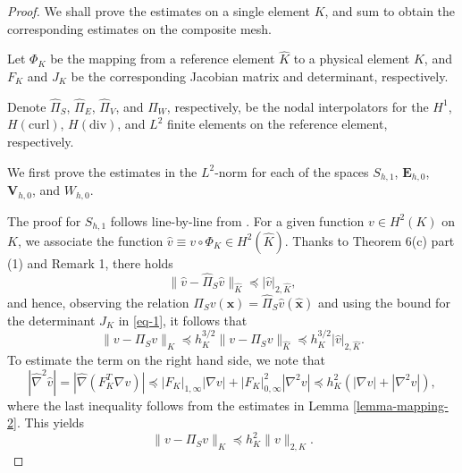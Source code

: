 \documentclass[twoside,reqno,final]{amsart}
\renewcommand{\b}[1]{{\boldsymbol{#1}}}
\newcommand{\pol}{\mathbb{P}}
\begin{document}
\begin{proof}
We shall prove the estimates on a single element $K$, and sum to obtain 
the corresponding estimates on the composite mesh.

Let $\Phi_K$ be the mapping from a reference element $\widehat K$ to a physical element $K$, and 
$F_K$ and $J_K$ be the corresponding Jacobian matrix and determinant, respectively.

 Denote $\widehat {\varPi}_S$,
  $\widehat {\b \varPi}_E$,  $\widehat {\b \varPi}_V$,  and 
  $\widehat {\varPi}_W$, respectively,  be the nodal interpolators for the 
  $H^1$, $H(\mathrm{curl})$, $H(\mathrm{div})$, and $L^2$ finite elements on the reference element, respectively.

We first prove the estimates in the $L^2$-norm for each of the spaces $S_{h,1}$, $\b E_{h,0}$, $\b V_{h,0}$, and 
$W_{h,0}$.

The proof for $S_{h,1}$ follows line-by-line from \cite[Lemma 1]{RannacherTurek92}.
 For a given function $v\in H^2(K)$ on $K$, we associate the function 
 $\widehat v\equiv v\circ \Phi_K \in H^2(\widehat K)$.
Thanks to Theorem 6(c) part (1) and Remark 1, there holds
\[
 \|\widehat v-\widehat \varPi_S\widehat v\|_{\widehat K}\preceq 
  |\widehat v|_{2, \widehat K},
\]
and hence, observing the relation $\varPi_S v(\b x) = \widehat {\varPi}_S \widehat v(\widehat{\b x})$ and using the bound 
for the determinant $J_K$ in \eqref{eq-1}, it follows that 
\[
\|v- \varPi_S v\|_{K}\preceq h_K^{3/2} 
\|v- \varPi_S v\|_{\widehat K}\preceq h_K^{3/2} |\widehat v|_{2, \widehat K}. 
\]
To estimate the term on the right hand side, we note that 
\[
 |\widehat{\nabla}^2\widehat v| = 
  |\widehat{\nabla}(F_K^T \nabla v)|
  \preceq 
  |F_K|_{1,\infty} |\nabla v|+|F_K|^2_{0,\infty} |\nabla^2 v|
  \preceq h_K^2(|\nabla v|+|\nabla^2 v|),
\]
where the last inequality follows from the estimates in Lemma \ref{lemma-mapping-2}.
This yields
\[
 \|v- \varPi_S v\|_{K}\preceq h_K^2\|v\|_{2,K}.
\]


\end{proof}
\end{document}
